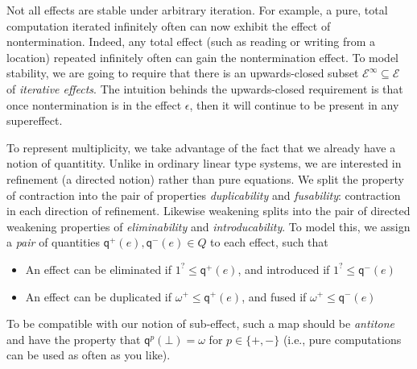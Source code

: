 \documentclass[acmsmall,screen,anonymous,review]{acmart}
\newcommand{\mc}[1]{\ensuremath{\mathcal{#1}}}
\newcommand{\ms}[1]{\ensuremath{\mathsf{#1}}}
\newcommand{\delq}{1^?}
\newcommand{\cpyq}{\omega^+}
\newcommand{\topq}{\omega}
\newcommand{\alquant}{\ms{q}}
\begin{document}
Not all effects are stable under arbitrary iteration. For example, a pure, total computation
iterated infinitely often can now exhibit the effect of nontermination. Indeed, any total effect
(such as reading or writing from a location) repeated infinitely often can gain the nontermination
effect. To model stability, we are going to require that there is an upwards-closed subset
$\mc{E}^\infty \subseteq \mc{E}$ of \emph{iterative effects}. The intuition behinds the
upwards-closed requirement is that once nontermination is in the effect $\epsilon$, then it will
continue to be present in any supereffect.

To represent multiplicity, we take advantage of the fact that we already
have a notion of quantitity.  Unlike in ordinary linear type
systems, we are interested in refinement (a directed notion) rather than pure equations.  We
split the property of contraction into the pair of properties
\emph{duplicability} and \emph{fusability}: contraction in each direction of refinement. Likewise
weakening splits into the pair of directed weakening properties of \emph{eliminability} and
\emph{introducability}. To model this, we assign a \emph{pair} of quantities $\alquant^+(e),
\alquant^-(e) \in Q$ to each effect, such that
\begin{itemize}
  \item An effect can be eliminated if $\delq \leq \alquant^+(e)$, and introduced if $\delq \leq
  \alquant^-(e)$
  \item An effect can be duplicated if $\cpyq \leq \alquant^+(e)$, and fused if $\cpyq \leq
  \alquant^-(e)$
\end{itemize}
To be compatible with our notion of sub-effect, such a map should be \emph{antitone} and have
the property that $\alquant^p(\bot) = \topq$ for $p \in \{+, -\}$ (i.e., pure computations can
be used as often as you like).
\end{document}
